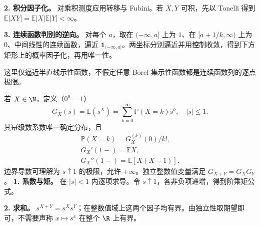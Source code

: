 \textbf{2. 积分因子化。} 对乘积测度应用转移与 Fubini。若 $X,Y$ 可积，先以 Tonelli 得到 $\mathbb E|XY|=\mathbb E|X|\mathbb E|Y|<\infty$。

\textbf{3. 连续函数判别的逆向。} 对每个 $a$，取在 $(-\infty,a]$ 上为 $1$、在 $[a+1/k,\infty)$ 上为 $0$、中间线性的连续函数，逼近 $\mathbf1_{(-\infty,a]}$。两坐标分别逼近并用控制收敛，得到下方矩形上的概率因子化，再用唯一性。

这里仅逼近半直线示性函数，不假定任意 Borel 集示性函数都是连续函数列的逐点极限。

若 $X\in\N$，定义（$0^0=1$）
\[
G_X(s)=\mathbb E(s^X)
=\sum_{k=0}^{\infty}\mathbb P(X=k)s^k,\quad |s|\le1.
\]
其幂级数系数唯一确定分布，且
\[
\begin{gathered}
\mathbb P(X=k)=G_X^{(k)}(0)/k!,\\
G_X'(1-)=\mathbb EX,\\
G_X''(1-)=\mathbb E[X(X-1)].
\end{gathered}
\]
边界导数可理解为 $s\uparrow1$ 的极限，允许 $+\infty$。独立整数值变量满足 $G_{X+Y}=G_XG_Y$。
\textbf{1. 系数与矩。} 在 $|s|<1$ 内逐项求导。令 $s\uparrow1$，各非负项递增，得到阶乘矩公式。

\textbf{2. 求和。} $s^{X+Y}=s^Xs^Y$；在整数值域上这两个因子均有界。由独立性取期望即可，不需要声称 $x\mapsto s^x$ 在整个 $\R$ 上有界。
